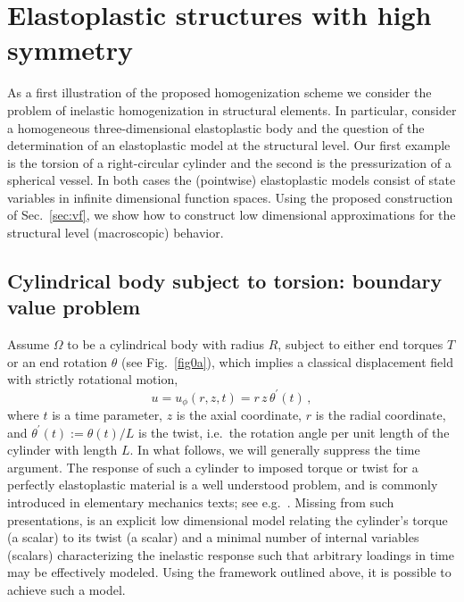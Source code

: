 \documentclass[final,1p,times]{elsarticle}
\newcommand{\be}{\begin{equation}}
\newcommand{\ee}{\end{equation}}
\begin{document}
\section{Elastoplastic structures with high symmetry}

As a first illustration of the proposed homogenization scheme we consider the problem of inelastic homogenization in structural elements.  In particular, consider a homogeneous three-dimensional elastoplastic body and the question of the determination of an elastoplastic model at the structural level. Our first example is the torsion of a right-circular cylinder and the second is the pressurization of a spherical vessel.  In both cases the (pointwise) elastoplastic models  consist of state variables in infinite dimensional function spaces.  Using the proposed construction of Sec.~\ref{sec:vf}, we show how to construct low dimensional approximations for the structural level (macroscopic) behavior.

\subsection{Cylindrical body subject to torsion: boundary value problem}
\label{cyl}

Assume $\Omega$ to be a cylindrical body with radius $R$, subject to either end torques $T$ or an end rotation $\theta$ (see Fig.~\ref{fig0a}), which implies a classical displacement field with strictly rotational motion, 
\be
\label{eq79}
u=u_\phi(r,z,t) = r \, z \, \theta^\prime(t)\,,
\ee 
where $t$ is a time parameter, $z$ is the axial coordinate, $r$ is the radial coordinate, and $\theta^\prime(t) := \theta(t)/L$ is the twist, i.e.\ the rotation angle per unit length of the cylinder with length $L$.  In what follows, we will generally suppress the time argument.
The response of such a cylinder to imposed torque or twist for a perfectly elastoplastic material is a well understood problem, and is commonly introduced in elementary mechanics texts; see e.g.\ \citet[][Sec.~7.6]{govindjee2013}.  Missing from such presentations, is an explicit low dimensional model relating the cylinder's torque (a scalar) to its twist (a scalar) and a minimal number of internal variables (scalars) characterizing the inelastic response such that arbitrary loadings in time may be effectively modeled.  Using the framework outlined above, it is possible to achieve such a model.
\end{document}
